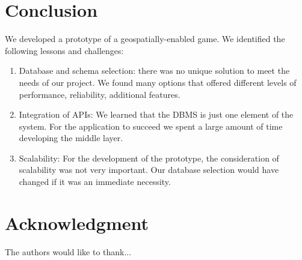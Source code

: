 \documentclass[conference]{IEEEtran}
\begin{document}
\section{Conclusion}

We developed a prototype of a geospatially-enabled game. We identified the following lessons and challenges:

\begin{enumerate}
\item Database and schema selection: there was no unique solution to meet the needs of our project. We found many options that offered different levels of performance, reliability, additional features.
\item Integration of APIs: We learned that the DBMS is just one element of the system. For the application to succeed we spent a large amount of time developing the middle layer.
\item Scalability: For the development of the prototype, the consideration of scalability was not very important. Our database selection would have changed if it was an immediate necessity. 
\end{enumerate}

\section*{Acknowledgment}


The authors would like to thank...
\end{document}
